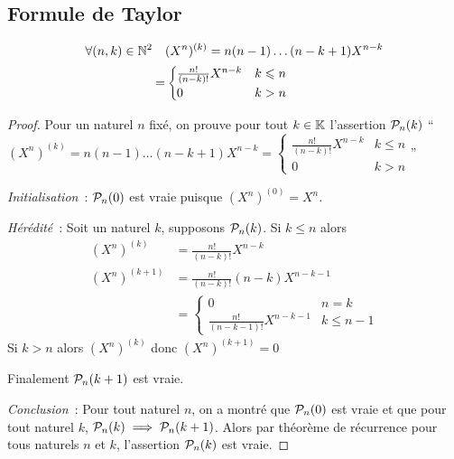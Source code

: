 \subsection{Formule de Taylor}

\begin{lemme}
  \begin{align}
    \forall (n,k) \in \N^2 \quad &(X^n)^{(k)} = n(n-1) \ldots (n-k+1) X^{n-k}\\
    = &\begin{cases}
      \frac{n!}{(n-k)!} X^{n-k} & k \leqslant n \\
      0 & k > n
    \end{cases}
  \end{align}
\end{lemme}
\begin{proof}
  Pour un naturel \(n\) fixé, on prouve pour tout \(k \in \K\) l'assertion \(\P_n(k)\) ``\((X^n)^{(k)} = n(n-1) \ldots (n-k+1) X^{n-k}=
    \begin{cases}
      \frac{n!}{(n-k)!} X^{n-k} & k \leqslant n \\
      0 & k > n
    \end{cases}\)''

    \emph{Initialisation}~: \(\P_n(0)\) est vraie puisque \((X^n)^{(0)} = X^n\).

    \emph{Hérédité}~: Soit un naturel \(k\), supposons \(\P_n(k)\). Si \(k \leqslant n\) alors
    \begin{align}
      (X^n)^{(k)} &= \frac{n!}{(n-k)!} X^{n-k} \\
      (X^n)^{(k+1)} &= \frac{n!}{(n-k)!} (n-k) X^{n-k-1} \\
      &=\begin{cases} 0 & n=k \\ \frac{n!}{(n-k-1)!} X^{n-k-1} & k \leqslant n-1 \end{cases}
    \end{align}
    Si \(k > n\) alors \((X^n)^{(k)}\) donc \((X^n)^{(k+1)}=0\)

    Finalement \(\P_n(k+1)\) est vraie.

    \emph{Conclusion}~: Pour tout naturel \(n\), on a montré que \(\P_n(0)\) est vraie et que pour tout naturel \(k\), \(\P_n(k) \implies \P_n(k+1)\). Alors par théorème de récurrence pour tous naturels \(n\) et \(k\), l'assertion \(\P_n(k)\) est vraie.
\end{proof}

